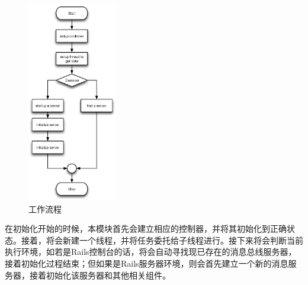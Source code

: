 \begin{figure}[h]
\centering
\includegraphics[width=0.35\textwidth]{images/detail/gem_process.eps}
\caption{工作流程}
\label{fig-gem-process}
\end{figure}

在初始化开始的时候，本模块首先会建立相应的控制器，并将其初始化到正确状态。接着，将会新建一个线程，并将任务委托给子线程进行。接下来将会判断当前执行环境，如若是Rails控制台的话，将会自动寻找现已存在的消息总线服务器，接着初始化过程结束；但如果是Rails服务器环境，则会首先建立一个新的消息服务器，接着初始化该服务器和其他相关组件。

